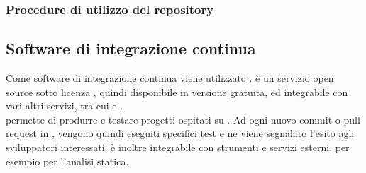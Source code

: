 \subsubsection{Procedure di utilizzo del repository}

\subsection{Software di integrazione continua}
Come software di integrazione continua viene utilizzato \textbf{}.
 è un servizio open source sotto licenza , quindi disponibile in versione gratuita,  ed integrabile con vari altri servizi, tra cui  e .\\  permette di produrre e testare progetti ospitati su . Ad ogni nuovo commit o pull request in , vengono quindi eseguiti specifici test e ne viene segnalato l'esito agli sviluppatori interessati.  è inoltre integrabile con strumenti e servizi esterni, per esempio per l'analisi statica.

